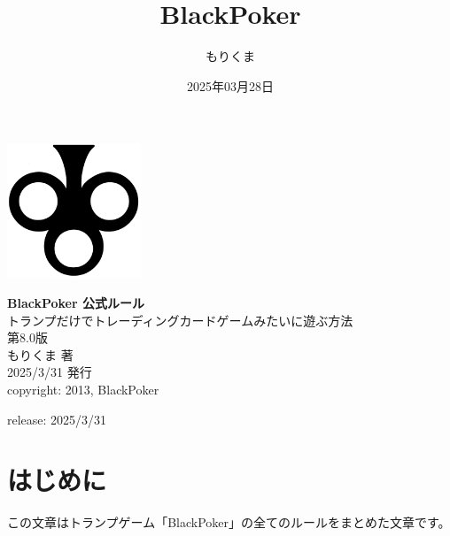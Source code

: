\documentclass[letterpaper,10pt,dvipdfmx]{sphinxmanual}
\title{BlackPoker}
\date{2025年03月28日}
\author{もりくま}
\begin{document}
\pagestyle{empty}

\begin{titlepage}
\begin{center}
\vspace*{25mm}

\includegraphics[width=4cm]{blackpoker_logo.pdf}  %

\vspace{20mm}
{\Huge \textbf{BlackPoker 公式ルール}}\\[10mm]
{\Large トランプだけでトレーディングカードゲームみたいに遊ぶ方法}\\[30mm]

{\huge 第8.0版}\\[20mm]

{\Large もりくま 著} \\[5mm]
{\Large 2025/3/31 発行}\\[10mm]

{\small copyright: 2013, BlackPoker}

\end{center}
\end{titlepage}

\clearpage
\thispagestyle{empty}  %
\null                  %
\clearpage             %

\pagestyle{plain}
\sphinxtableofcontents
\pagestyle{normal}
\label{\detokenize{index::doc}}


\sphinxAtStartPar
release: 2025/3/31

\sphinxstepscope


\chapter{はじめに}
\label{\detokenize{init/init:init-rst}}\label{\detokenize{init/init:id1}}\label{\detokenize{init/init::doc}}
\sphinxAtStartPar
この文章はトランプゲーム「BlackPoker」の全てのルールをまとめた文章です。
\end{document}
